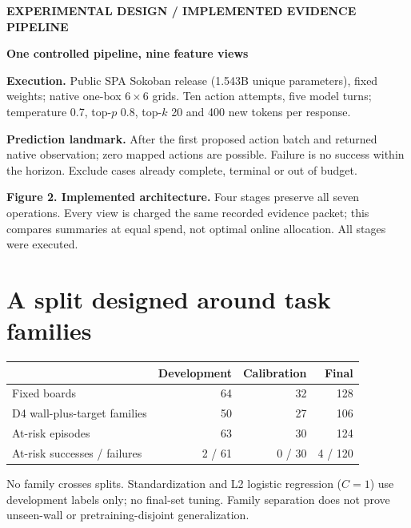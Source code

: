 \documentclass[10pt,a4paper]{article}
\newcommand{\eyebrow}[1]{{\small\bfseries\color{blue}\MakeUppercase{#1}}\par\vspace{4pt}}
\newcommand{\captiontext}[1]{{\fontsize{8.8}{10.6}\selectfont\color{slate}#1\par}}
\newcommand{\smallbody}{\fontsize{9.5}{11.3}\selectfont}
\begin{document}
\newpage
\eyebrow{Experimental design \quad / \quad Implemented evidence pipeline}
{\fontsize{17}{20}\selectfont\bfseries\color{navy}One controlled pipeline, nine feature views\par}
\vspace{6pt}
\smallbody
\begin{minipage}[t]{.49\linewidth}
\textbf{Execution.} Public SPA Sokoban release (1.543B unique parameters), fixed weights; native one-box $6\times6$ grids. Ten action attempts, five model turns; temperature 0.7, top-$p$ 0.8, top-$k$ 20 and 400 new tokens per response.
\end{minipage}\hfill
\begin{minipage}[t]{.48\linewidth}
\textbf{Prediction landmark.} After the first proposed action batch and returned native observation; zero mapped actions are possible. Failure is no success within the horizon. Exclude cases already complete, terminal or out of budget.
\end{minipage}\par
\vspace{8pt}
\noindent\makebox[\linewidth][c]{}\par\vspace{3pt}
\captiontext{\textbf{Figure 2. Implemented architecture.} Four stages preserve all seven operations. Every view is charged the same recorded evidence packet; this compares summaries at equal spend, not optimal online allocation. All stages were executed.}

\section{A split designed around task families}
\begin{tabularx}{\linewidth}{@{}Xrrr@{}}
\toprule
& Development & Calibration & Final\\\midrule
Fixed boards & 64 & 32 & 128\\
D4 wall-plus-target families & 50 & 27 & 106\\
At-risk episodes & 63 & 30 & 124\\
At-risk successes / failures & 2 / 61 & 0 / 30 & 4 / 120\\\bottomrule
\end{tabularx}
\vspace{2pt}
No family crosses splits. Standardization and L2 logistic regression ($C=1$) use development labels only; no final-set tuning. Family separation does not prove unseen-wall or pretraining-disjoint generalization.
\end{document}
